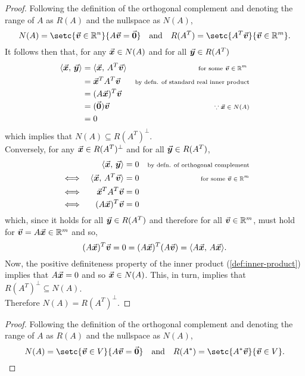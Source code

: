 \documentclass[../MathsNotesBase.tex]{subfiles}
\begin{document}
{		\bigskip
		\begin{proof}
			Following the definition of the orthogonal complement and denoting the range of $A$ as $R(A)$ and the nullspace as $N(A)$,
			\[ N(A) = \setc{\v \in \R{n}}{A\v = \0} \eqand R(A^T) = \setc{A^T\v}{\v \in \R{m}}. \]
			It follows then that, for any ${ \vec{\bm{x}} \in N(A) }$ and for all ${ \vec{\bm{y}} \in R(A^T)}$
			\[\begin{aligned}
				\langle \vec{\bm{x}},\, \vec{\bm{y}} \rangle &= \langle \vec{\bm{x}},\, A^T\vec{\bm{v}} \rangle &\text{\scriptsize{for some ${ \vec{\bm{v}} \in \mathbb{R}^{m} }$ }}\\
				&= \vec{\bm{x}}^T A^T\vec{\bm{v}} &\text{\scriptsize{by defn. of standard real inner product}} \\
				&= (A\vec{\bm{x}})^T \vec{\bm{v}} &\text{\scriptsize{}} \\
				&= (\vec{\bm{0}}) \vec{\bm{v}} &\text{\scriptsize{${ \because \vec{\bm{x}} \in N(A) }$}} \\
				&= 0
			\end{aligned}\]
			which implies that ${ N(A) \subseteq R(A^T)^\perp }$.\\
			
			Conversely, for any ${ \vec{\bm{x}} \in R(A^T)^\perp }$ and for all ${ \vec{\bm{y}} \in R(A^T) }$,
			\[\begin{aligned}
				&& \langle \vec{\bm{x}},\, \vec{\bm{y}} \rangle &= 0 &\text{\scriptsize{by defn. of orthogonal complement}}\\
				&\iff & \langle \vec{\bm{x}},\, A^T \vec{\bm{v}} \rangle &= 0 &\text{\scriptsize{for some ${ \vec{\bm{v}} \in \mathbb{R}^{m} }$}} \\
				&\iff & \vec{\bm{x}}^T A^T \vec{\bm{v}} &= 0 \\
				&\iff & (A \vec{\bm{x}})^T \vec{\bm{v}} &= 0
			\end{aligned}\]
			which, since it holds for all ${ \vec{\bm{y}} \in R(A^T) }$ and therefore for all ${ \vec{\bm{v}} \in \mathbb{R}^{m} }$, must hold for ${ \vec{\bm{v}} = A \vec{\bm{x}} \in \mathbb{R}^{m} }$ and so,
			\[ (A \vec{\bm{x}})^T \vec{\bm{v}} = 0 = (A \vec{\bm{x}})^T (A \vec{\bm{v}}) = \langle A\vec{\bm{x}},\, A\vec{\bm{x}} \rangle. \]
			Now, the positive definiteness property of the inner product (\ref{def:inner-product}) implies that ${ A\vec{\bm{x}} = 0 }$ and so ${ \vec{\bm{x}} \in N(A) }$. This, in turn, implies that ${ R(A^T)^\perp \subseteq N(A) }$.\\
			
			Therefore ${ N(A) = R(A^T)^\perp }$.
		\end{proof}
		
		\bigskip
		\begin{proof}
			Following the definition of the orthogonal complement and denoting the range of $A$ as $R(A)$ and the nullspace as $N(A)$,
			\[ N(A) = \setc{\v \in V}{A\v = \0} \eqand R(A^*) = \setc{A^*\v}{\v \in V}. \]
			

\end{proof}}
\end{document}

